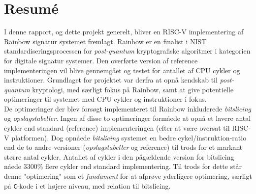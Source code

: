 \section*{Resumé}
I denne rapport, og dette projekt generelt, bliver en RISC-V implementering af Rainbow signatur systemet fremlagt. Rainbow er en finalist i NIST standardiseringsprocessen for \emph{post-quantum} kryptografiske algoritmer i kategorien for digitale signatur systemer. Den overførte version af reference implementeringen vil blive gennemgået og testet for antallet af CPU cykler og instruktioner. Grundlaget for projektet var derfra at opnå kendskab til \emph{post-quantum} kryptologi, med særligt fokus på Rainbow, samt at give potentielle optimeringer til systemet med CPU cykler og instruktioner i fokus.
\medskip\\
De optimeringer der blev forsøgt implementeret til Rainbow inkluderede \emph{bitslicing} og \emph{opslagstabeller}. Ingen af disse to optimeringer formåede at opnå et lavere antal cykler end standard (reference) implementeringen (efter at være oversat til RISC-V platformen). Dog opnåede \emph{bitslicing} systemet en bedre cykel/instruktion-ratio end de to andre versioner (\emph{opslagstabeller} og reference) til trods for et markant større antal cykler. Antallet af cykler i den pågældende version for bitslicing nåede 3300\% flere cykler end standard implementering. Til trods for dette står denne "optimering" som et \emph{fundament} for at afprøve yderligere optimering, særligt på \texttt{C}-kode i et højere niveau, med relation til bitslicing.

\pagebreak
